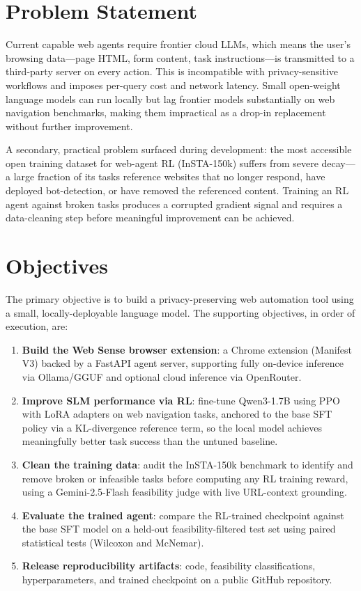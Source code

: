 \documentclass[12pt,a4paper]{report}
\begin{document}
\section{Problem Statement}

Current capable web agents require frontier cloud LLMs, which means the user's browsing data---page HTML, form content, task instructions---is transmitted to a third-party server on every action. This is incompatible with privacy-sensitive workflows and imposes per-query cost and network latency. Small open-weight language models can run locally but lag frontier models substantially on web navigation benchmarks, making them impractical as a drop-in replacement without further improvement.

A secondary, practical problem surfaced during development: the most accessible open training dataset for web-agent RL (InSTA-150k) suffers from severe decay---a large fraction of its tasks reference websites that no longer respond, have deployed bot-detection, or have removed the referenced content. Training an RL agent against broken tasks produces a corrupted gradient signal and requires a data-cleaning step before meaningful improvement can be achieved.

\section{Objectives}

The primary objective is to build a privacy-preserving web automation tool using a small, locally-deployable language model. The supporting objectives, in order of execution, are:

\begin{enumerate}
  \item \textbf{Build the Web Sense browser extension}: a Chrome extension (Manifest V3) backed by a FastAPI agent server, supporting fully on-device inference via Ollama/GGUF and optional cloud inference via OpenRouter.
  \item \textbf{Improve SLM performance via RL}: fine-tune Qwen3-1.7B using PPO with LoRA adapters on web navigation tasks, anchored to the base SFT policy via a KL-divergence reference term, so the local model achieves meaningfully better task success than the untuned baseline.
  \item \textbf{Clean the training data}: audit the InSTA-150k benchmark to identify and remove broken or infeasible tasks before computing any RL training reward, using a Gemini-2.5-Flash feasibility judge with live URL-context grounding.
  \item \textbf{Evaluate the trained agent}: compare the RL-trained checkpoint against the base SFT model on a held-out feasibility-filtered test set using paired statistical tests (Wilcoxon and McNemar).
  \item \textbf{Release reproducibility artifacts}: code, feasibility classifications, hyperparameters, and trained checkpoint on a public GitHub repository.
\end{enumerate}
\end{document}
